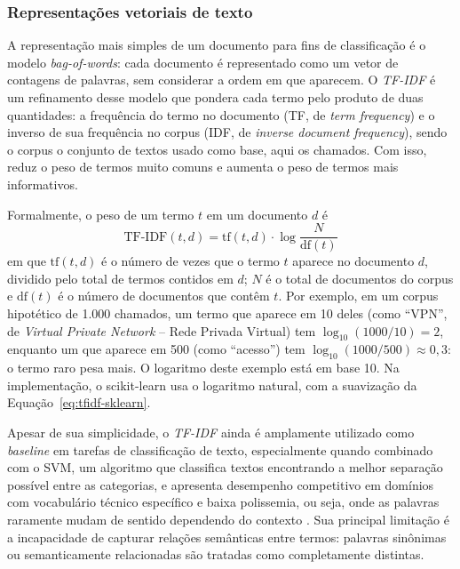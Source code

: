\documentclass[
    12pt,                %
    openright,           %
    oneside,             %
    a4paper,             %
    english,             %
    brazil               %
]{abntex2}
\begin{document}
\subsubsection{Representações vetoriais de texto}
\label{subsec:pln_representacoes}

\label{subsubsec:pln_tfidf}

A representação mais simples de um documento para fins de classificação é o modelo \textit{bag-of-words}: cada documento é representado como um vetor de contagens de palavras, sem considerar a ordem em que aparecem. O \textit{TF-IDF} é um refinamento desse modelo que pondera cada termo pelo produto de duas quantidades: a frequência do termo no documento (TF, de \textit{term frequency}) e o inverso de sua frequência no corpus (IDF, de \textit{inverse document frequency}), sendo o corpus o conjunto de textos usado como base, aqui os chamados. Com isso, reduz o peso de termos muito comuns e aumenta o peso de termos mais informativos.

Formalmente, o peso de um termo $t$ em um documento $d$ é
\begin{equation}
\mathrm{TF\text{-}IDF}(t,d) = \mathrm{tf}(t,d) \cdot \log \frac{N}{\mathrm{df}(t)}
\label{eq:tfidf}
\end{equation}
em que $\mathrm{tf}(t,d)$ é o número de vezes que o termo $t$ aparece no documento $d$, dividido pelo total de termos contidos em $d$; $N$ é o total de documentos do corpus e $\mathrm{df}(t)$ é o número de documentos que contêm $t$. Por exemplo, em um corpus hipotético de 1.000 chamados, um termo que aparece em 10 deles (como ``VPN'', de \textit{Virtual Private Network} -- Rede Privada Virtual) tem $\log_{10}(1000/10) = 2$, enquanto um que aparece em 500 (como ``acesso'') tem $\log_{10}(1000/500) \approx 0{,}3$: o termo raro pesa mais. O logaritmo deste exemplo está em base 10. Na implementação, o scikit-learn usa o logaritmo natural, com a suavização da Equação~\ref{eq:tfidf-sklearn}. %

Apesar de sua simplicidade, o \textit{TF-IDF} ainda é amplamente utilizado como \textit{baseline} em tarefas de classificação de texto, especialmente quando combinado com o SVM, um algoritmo que classifica textos encontrando a melhor separação possível entre as categorias, e apresenta desempenho competitivo em domínios com vocabulário técnico específico e baixa polissemia, ou seja, onde as palavras raramente mudam de sentido dependendo do contexto \cite{wahba2023}. Sua principal limitação é a incapacidade de capturar relações semânticas entre termos: palavras sinônimas ou semanticamente relacionadas são tratadas como completamente distintas.
\end{document}
